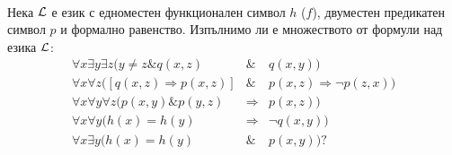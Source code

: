 \documentclass[]{article}
\begin{document}
\paragraph{}

Нека ${\cal L}$ е език с едноместен функционален
символ $h$ ($f$), двуместен предикатен символ $p$ и формално равенство. 
Изпълнимо ли е множеството от формули над езика ${\cal L}$:
\begin{eqnarray*}
\forall x \exists y\exists z (y\neq z \& q(x,z)& \& &q(x,y))\\
\forall x \forall z ([q(x,z)\Rightarrow p(x,z)] &\&& p(x,z) \Rightarrow \neg p(z,x))\\
\forall x \forall y \forall z (p(x,y) \& p(y,z) &\Rightarrow &p(x,z)) \\
\forall x \forall y (h(x) = h(y) &\Rightarrow &\neg q(x,y)) \\
\forall x \exists y (h(x)=h(y) &\& & p(x,y))?
\end{eqnarray*}
\end{document}
